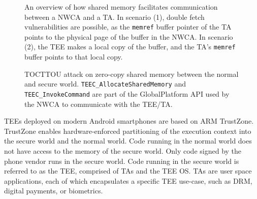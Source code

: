 \documentclass[conference]{IEEEtran}
\begin{document}
\begin{listing}[]
    \label{lst:exdf}
\end{listing}

\begin{figure}[h]
  \centering
  
  \caption{
    An overview of how shared memory facilitates communication between a NWCA and a TA.
    In scenario (1), double fetch vulnerabilities are possible, as the \texttt{memref} 
    buffer pointer of the TA points to the physical page of the buffer in the NWCA. 
    In scenario (2), the TEE makes a local copy of the buffer, and the TA's \texttt{memref} buffer 
    points to that local copy.
    }
  \label{fig:shmex}
\end{figure}

\begin{figure}[]
  \centering
  
  \caption{
    TOCTTOU attack on zero-copy shared memory between the normal and secure world.
    \texttt{TEEC\_AllocateSharedMemory} and \texttt{TEEC\_InvokeCommand} are part of the GlobalPlatform 
    API used by the NWCA to communicate with the TEE/TA.
    }
  \label{fig:tocttouex}
\end{figure}

TEEs deployed on modern Android smartphones are based on ARM TrustZone. 
TrustZone enables hardware-enforced partitioning of the execution context into 
the secure world and the normal world. Code running in the normal world does not 
have access to the memory of the secure world. Only code signed by the phone 
vendor runs in the secure world. Code running in the secure world is referred 
to as the TEE, comprised of TAs and the TEE OS. TAs are user space applications, 
each of which encapsulates a specific TEE use-case, such as DRM, digital 
payments, or biometrics.
\end{document}
